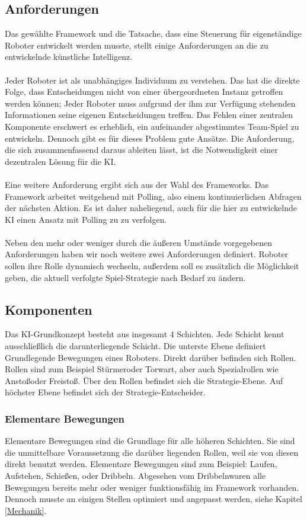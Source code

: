 \documentclass[fontsize=12pt,a4paper,draft]{scrartcl}[2003/01/01]
\begin{document}
\subsection{Anforderungen}
Das gewählte Framework und die Tatsache, dass eine Steuerung für eigenständige Roboter entwickelt werden musste, stellt einige Anforderungen an die zu entwickelnde künstliche Intelligenz.\\
\\
Jeder Roboter ist als unabhängiges Individuum zu verstehen. Das hat die direkte Folge, dass Entscheidungen nicht von einer übergeordneten Instanz getroffen werden können; Jeder Roboter muss aufgrund der ihm zur Verfügung stehenden Informationen seine eigenen Entscheidungen treffen. Das Fehlen einer zentralen Komponente erschwert es erheblich, ein aufeinander abgestimmtes Team-Spiel zu entwickeln. Dennoch gibt es für dieses Problem gute Ansätze. Die Anforderung, die sich zusammenfassend daraus ableiten lässt, ist die Notwendigkeit einer dezentralen Lösung für die KI.\\
\\
Eine weitere Anforderung ergibt sich aus der Wahl des Frameworks. Das Framework arbeitet weitgehend mit Polling, also einem kontinuierlichen Abfragen der nächsten Aktion. Es ist daher naheliegend, auch für die hier zu entwickelnde KI einen Ansatz mit Polling zu zu verfolgen.\\
\\
Neben den mehr oder weniger durch die äußeren Umstände vorgegebenen Anforderungen haben wir noch weitere zwei Anforderungen definiert. Roboter sollen ihre Rolle dynamisch wechseln, außerdem soll es zusätzlich die Möglichkeit geben, die aktuell verfolgte Spiel-Strategie nach Bedarf zu ändern.

\subsection{Komponenten}
Das KI-Grundkonzept besteht aus insgesamt 4 Schichten. Jede Schicht kennt ausschließlich die darunterliegende Schicht. Die unterste Ebene definiert Grundlegende Bewegungen eines Roboters. Direkt darüber befinden sich Rollen. Rollen sind zum Beispiel \glqq Stürmer\grqq oder \glqq Torwart\grqq, aber auch Spezialrollen wie \glqq Anstoß\grqq oder \glqq Freistoß\grqq. Über den Rollen befindet sich die Strategie-Ebene. Auf höchster Ebene befindet sich der Strategie-Entscheider.

\subsubsection{Elementare Bewegungen}
Elementare Bewegungen sind die Grundlage für alle höheren Schichten. Sie sind die unmittelbare Voraussetzung die darüber liegenden Rollen, weil sie von diesen direkt benutzt werden. Elementare Bewegungen sind zum Beispiel: \glqq Laufen\grqq, \glqq Aufstehen\grqq, \glqq Schießen\grqq, oder \glqq Dribbeln\grqq. Abgesehen vom \glqq Dribbeln\grqq waren alle Bewegungen bereits mehr oder weniger funktionsfähig im Framework vorhanden. Dennoch musste an einigen Stellen optimiert und angepasst werden, siehe Kapitel \ref{Mechanik}.
\end{document}
